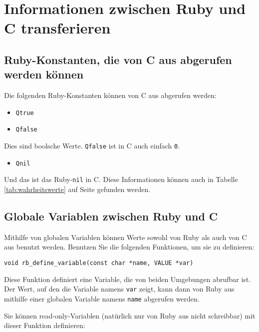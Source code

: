 \chapter{Informationen zwischen Ruby und C transferieren}
\label{cha:infos-ruby-c}

\section{Ruby-Konstanten, die von C aus abgerufen werden können}
\label{sec:ruby-konstanten-von-c}

Die folgenden Ruby-Konstanten können von C aus abgerufen werden:

\begin{itemize}
\item \verb+Qtrue+
\item \verb+Qfalse+
\end{itemize}

\noindent Dies sind boolsche Werte. \verb+Qfalse+ ist in C auch
einfach \verb+0+.

\begin{itemize}
\item \verb+Qnil+
\end{itemize}

\noindent Und das ist das Ruby-\verb+nil+ in C. Diese Informationen
können auch in Tabelle \ref{tab:wahrheitswerte} auf Seite
\pageref{tab:wahrheitswerte} gefunden werden.

\section{Globale Variablen zwischen Ruby und C}
\label{sec:glob-variablen-ruby-c}

Mithilfe von globalen Variablen können Werte sowohl von Ruby als auch
von C aus benutzt werden. Benutzen Sie die folgenden Funktionen, um
sie zu definieren:

\begin{lstlisting}
void rb_define_variable(const char *name, VALUE *var)
\end{lstlisting}

Diese Funktion definiert eine Variable, die von beiden Umgebungen
abrufbar ist.  Der Wert, auf den die Variable namens \verb+var+ zeigt,
kann dann von Ruby aus mithilfe einer globalen Variable namens
\verb+name+  abgerufen werden.

Sie können read-only-Variablen (natürlich nur von Ruby aus nicht
schreibbar) mit dieser Funktion definieren:


